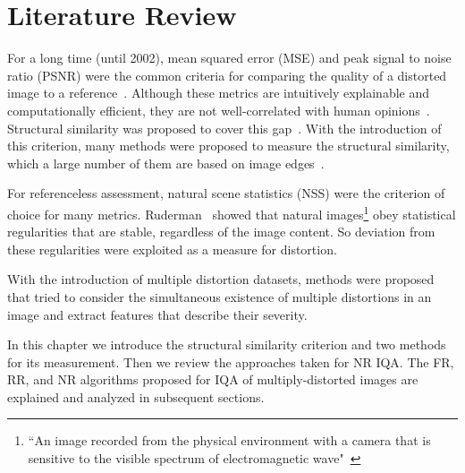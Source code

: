 \chapter{Literature Review}
For a long time (until 2002), mean squared error (MSE) and peak signal to noise ratio (PSNR) were the common criteria for comparing the quality of a distorted image to a reference~\cite{Wang2004}. Although these metrics are intuitively explainable and computationally efficient, they are not well-correlated with human opinions~\cite{Wang2009,Wang2002}. Structural similarity was proposed to cover this gap~\cite{Wang2002a}. With the introduction of this criterion, many methods were proposed to measure the structural similarity, which a large number of them are based on image edges~\cite{Xue2014}.

For referenceless assessment, natural scene statistics (NSS) were the criterion of choice for many metrics. Ruderman~\cite{Ruderman1994} showed that natural images\footnote{``An image recorded from the physical environment with a camera that is sensitive to the visible spectrum of electromagnetic wave"~\cite{Liu2014a}} obey statistical regularities that are stable, regardless of the image content. So deviation from these regularities were exploited as a measure for distortion.

With the introduction of multiple distortion datasets, methods were proposed that tried to consider the simultaneous existence of multiple distortions in an image and extract features that describe their severity.

In this chapter we introduce the structural similarity criterion and two methods for its measurement. Then we review the approaches taken for NR IQA. The FR, RR, and NR algorithms proposed for IQA of multiply-distorted images are explained and analyzed in subsequent sections.
